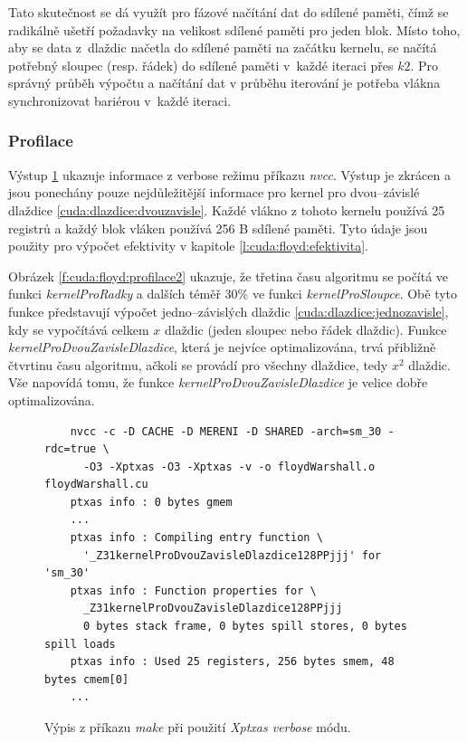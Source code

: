 Tato skutečnost se dá využít pro fázové načítání dat do sdílené paměti, čímž se radikálně ušetří požadavky na velikost sdílené paměti
pro jeden blok. Místo toho, aby se data z~dlaždic načetla do sdílené paměti na začátku kernelu, se načítá potřebný sloupec (resp. řádek)
do sdílené paměti v~každé iteraci přes $k2$. Pro správný průběh výpočtu a načítání dat v průběhu iterování je potřeba vlákna synchronizovat
bariérou v~každé iteraci.


\subsubsection{Profilace} \label{l:cuda:profilace}
Výstup \ref{f:cuda:floyd:profilace} ukazuje informace z verbose režimu příkazu \emph{nvcc}. Výstup je zkrácen a jsou ponechány pouze nejdůležitější informace pro kernel pro dvou--závislé dlaždice \ref{cuda:dlazdice:dvouzavisle}. Každé vlákno z tohoto kernelu používá 25 registrů a každý blok vláken používá 256 B sdílené paměti. Tyto údaje jsou použity pro výpočet efektivity v kapitole \ref{l:cuda:floyd:efektivita}.

Obrázek \ref{f:cuda:floyd:profilace2} ukazuje, že třetina času algoritmu se počítá ve funkci \emph{kernelProRadky} a dalších téměř 30\% ve funkci \emph{kernelProSloupce}.
Obě tyto funkce představují výpočet jedno--závislých dlaždic \ref{cuda:dlazdice:jednozavisle}, kdy se vypočítává celkem $x$ dlaždic (jeden sloupec nebo řádek dlaždic).
Funkce \emph{kernelProDvouZavisleDlazdice}, která je nejvíce optimalizována, trvá přibližně čtvrtinu času algoritmu, ačkoli se provádí pro všechny dlaždice, tedy $x^2$ dlaždic.
Vše napovídá tomu, že funkce \emph{kernelProDvouZavisleDlazdice} je velice dobře optimalizována.

\begin{figure}
	\centering
	\begin{verbatim}
	nvcc -c -D CACHE -D MERENI -D SHARED -arch=sm_30 -rdc=true \
	  -O3 -Xptxas -O3 -Xptxas -v -o floydWarshall.o floydWarshall.cu
	ptxas info : 0 bytes gmem
	...
	ptxas info : Compiling entry function \
	  '_Z31kernelProDvouZavisleDlazdice128PPjjj' for 'sm_30'
	ptxas info : Function properties for \
	  _Z31kernelProDvouZavisleDlazdice128PPjjj
	  0 bytes stack frame, 0 bytes spill stores, 0 bytes spill loads
	ptxas info : Used 25 registers, 256 bytes smem, 48 bytes cmem[0]
	...
	\end{verbatim}
	\caption{Výpis z příkazu \emph{make} při použití \emph{Xptxas verbose} módu.}
    \label{f:cuda:floyd:profilace}
\end{figure}


